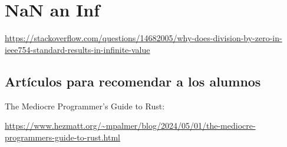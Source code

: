 \chapter{NaN an Inf}
   
   \url{https://stackoverflow.com/questions/14682005/why-does-division-by-zero-in-ieee754-standard-results-in-infinite-value}

\section{Artículos para recomendar a los alumnos}
The Mediocre Programmer's Guide to Rust:

{\footnotesize \url{https://www.hezmatt.org/~mpalmer/blog/2024/05/01/the-mediocre-programmers-guide-to-rust.html} \par}